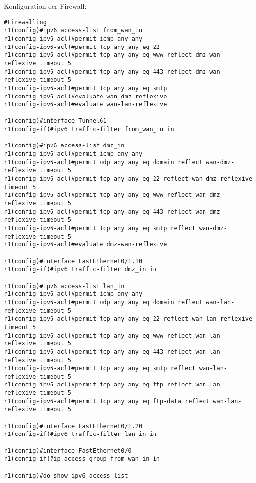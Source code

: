 Konfiguration der Firewall:
\begin{lstlisting}[numbers=none]
#Firewalling
r1(config)#ipv6 access-list from_wan_in
r1(config-ipv6-acl)#permit icmp any any
r1(config-ipv6-acl)#permit tcp any any eq 22
r1(config-ipv6-acl)#permit tcp any any eq www reflect dmz-wan-reflexive timeout 5
r1(config-ipv6-acl)#permit tcp any any eq 443 reflect dmz-wan-reflexive timeout 5
r1(config-ipv6-acl)#permit tcp any any eq smtp
r1(config-ipv6-acl)#evaluate wan-dmz-reflexive
r1(config-ipv6-acl)#evaluate wan-lan-reflexive

r1(config)#interface Tunnel61
r1(config-if)#ipv6 traffic-filter from_wan_in in

r1(config)#ipv6 access-list dmz_in
r1(config-ipv6-acl)#permit icmp any any
r1(config-ipv6-acl)#permit udp any any eq domain reflect wan-dmz-reflexive timeout 5
r1(config-ipv6-acl)#permit tcp any any eq 22 reflect wan-dmz-reflexive timeout 5
r1(config-ipv6-acl)#permit tcp any any eq www reflect wan-dmz-reflexive timeout 5
r1(config-ipv6-acl)#permit tcp any any eq 443 reflect wan-dmz-reflexive timeout 5
r1(config-ipv6-acl)#permit tcp any any eq smtp reflect wan-dmz-reflexive timeout 5
r1(config-ipv6-acl)#evaluate dmz-wan-reflexive

r1(config)#interface FastEthernet0/1.10
r1(config-if)#ipv6 traffic-filter dmz_in in

r1(config)#ipv6 access-list lan_in
r1(config-ipv6-acl)#permit icmp any any
r1(config-ipv6-acl)#permit udp any any eq domain reflect wan-lan-reflexive timeout 5
r1(config-ipv6-acl)#permit tcp any any eq 22 reflect wan-lan-reflexive timeout 5
r1(config-ipv6-acl)#permit tcp any any eq www reflect wan-lan-reflexive timeout 5
r1(config-ipv6-acl)#permit tcp any any eq 443 reflect wan-lan-reflexive timeout 5
r1(config-ipv6-acl)#permit tcp any any eq smtp reflect wan-lan-reflexive timeout 5
r1(config-ipv6-acl)#permit tcp any any eq ftp reflect wan-lan-reflexive timeout 5
r1(config-ipv6-acl)#permit tcp any any eq ftp-data reflect wan-lan-reflexive timeout 5

r1(config)#interface FastEthernet0/1.20
r1(config-if)#ipv6 traffic-filter lan_in in

r1(config)#interface FastEthernet0/0
r1(config-if)#ip access-group from_wan_in in

r1(config)#do show ipv6 access-list
\end{lstlisting}

